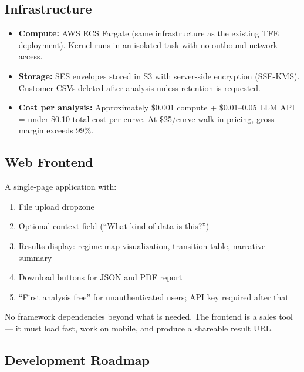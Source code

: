 \documentclass[11pt,letterpaper]{article}
\begin{document}
\subsection{Infrastructure}

\begin{itemize}
  \item \textbf{Compute:} AWS ECS Fargate (same infrastructure as
    the existing TFE deployment). Kernel runs in an isolated task
    with no outbound network access.
  \item \textbf{Storage:} SES envelopes stored in S3 with
    server-side encryption (SSE-KMS). Customer CSVs deleted after
    analysis unless retention is requested.
  \item \textbf{Cost per analysis:} Approximately \$0.001 compute
    + \$0.01--0.05 LLM API = under \$0.10 total cost per curve.
    At \$25/curve walk-in pricing, gross margin exceeds 99\%.
\end{itemize}

\subsection{Web Frontend}

A single-page application with:
\begin{enumerate}
  \item File upload dropzone
  \item Optional context field (``What kind of data is this?'')
  \item Results display: regime map visualization, transition table,
    narrative summary
  \item Download buttons for JSON and PDF report
  \item ``First analysis free'' for unauthenticated users; API key
    required after that
\end{enumerate}

No framework dependencies beyond what is needed. The frontend is a
sales tool --- it must load fast, work on mobile, and produce a
shareable result URL.

\subsection{Development Roadmap}
\end{document}
